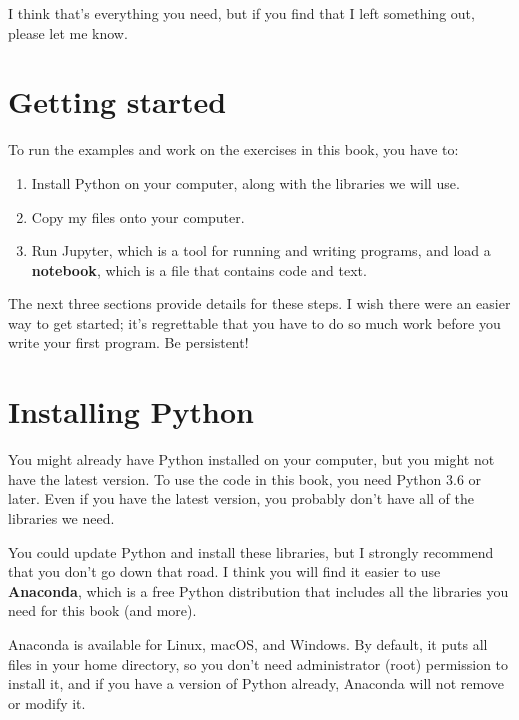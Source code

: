 \documentclass[12pt]{book}
\theoremstyle{exercise}
\begin{document}

I think that's everything you need, but if you find that I left something out, please let me know.


\section{Getting started}
\label{code}

To run the examples and work on the exercises in this book, you have to:

\begin{enumerate}

\item Install Python on your computer, along with the libraries we will use.

\item Copy my files onto your computer.

\item Run Jupyter, which is a tool for running and writing programs, and load a {\bf notebook}, which is a file that contains code and text.

\end{enumerate}

The next three sections provide details for these steps.  I wish there were an easier way to get started; it's regrettable that you have to do so much work before you write your first program.  Be persistent!


\section{Installing Python}

You might already have Python installed on your computer, but you might not have the latest version.  To use the code in this book, you need Python 3.6 or later.  Even if you have the latest version, you probably don't have all of the libraries we need.


You could update Python and install these libraries, but I strongly recommend that you don't go down that road.  I think you will find it easier to use {\bf Anaconda}, which is a free Python distribution that includes all the libraries you need for this book (and more).


Anaconda is available for Linux, macOS, and Windows.  By default, it puts all files in your home directory, so you don't need administrator (root) permission to install it, and if you have a version of Python already, Anaconda will not remove or modify it.
\end{document}
